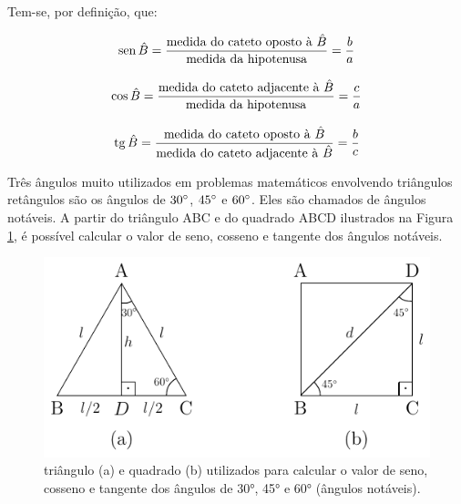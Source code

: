 Tem-se, por definição, que:

\begin{tcolorbox}[colback=white,colframe=minha_cor,coltitle=black,title=Definição de seno] 
\begin{equation}
    \operatorname{sen} \hat{B} = \displaystyle\frac{\text{medida do cateto oposto à } \hat{B}}{\text{medida da hipotenusa}} = \displaystyle\frac{b}{a}
    \label{eq:01}
\end{equation}
\end{tcolorbox}

\begin{tcolorbox}[colback=white,colframe=minha_cor,coltitle=black,title=Definição de cosseno] 
\begin{equation}
    \cos \hat{B} = \displaystyle\frac{\text{medida do cateto adjacente à } \hat{B}}{\text{medida da hipotenusa}}  = \displaystyle\frac{c}{a}
    \label{eq:02}
\end{equation}
\end{tcolorbox}

\begin{tcolorbox}[colback=white,colframe=minha_cor,coltitle=black,title=Definição de cosseno] 
\begin{equation}
    \operatorname{tg} \hat{B} = \displaystyle\frac{\text{medida do cateto oposto à } \hat{B}}{\text{medida do cateto adjacente à } \hat{B}} = \displaystyle\frac{b}{c}
    \label{eq:03}
\end{equation}
\end{tcolorbox}


Três ângulos muito utilizados em problemas matemáticos envolvendo triângulos retângulos são os ângulos de $30 \degree$, $45 \degree$ e $60 \degree$. Eles são chamados de ângulos notáveis. A partir do triângulo ABC e do quadrado ABCD ilustrados na Figura \ref{fig:02}, é possível calcular o valor de seno, cosseno e tangente dos ângulos notáveis.

\begin{figure}[h]
        \centering
        \includegraphics[scale=1.4]{Imagens/fig02.pdf}
        \caption{triângulo (a) e quadrado (b) utilizados para calcular o valor de seno, cosseno e tangente dos ângulos de 30°, 45° e 60° (ângulos notáveis).}
        \label{fig:02}
    \end{figure}

